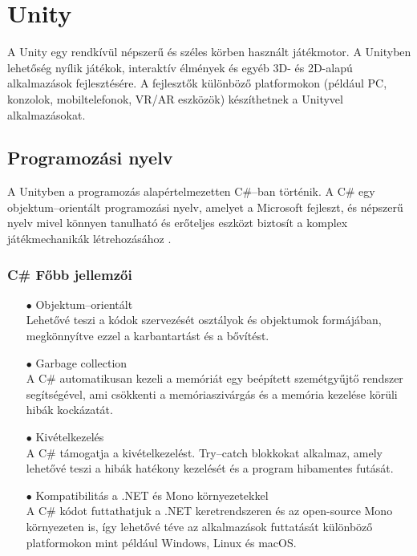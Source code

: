 \documentclass[
]{thesis-ekf}
\theoremstyle{definition}
\theoremstyle{remark}
\begin{document}
\section{Unity}
\label{sec:Unity}
A Unity egy rendkívül népszerű és széles körben használt játékmotor. A Unityben lehetőség nyílik játékok, interaktív élmények és egyéb 3D- és 2D-alapú alkalmazások fejlesztésére. A fejlesztők különböző platformokon (például PC, konzolok, mobiltelefonok, VR/AR eszközök) készíthetnek a Unityvel alkalmazásokat.
\subsection{Programozási nyelv}
A Unityben a programozás alapértelmezetten  C\#--ban történik. A C\# egy objektum--orientált programozási nyelv, amelyet a Microsoft fejleszt, és népszerű nyelv mivel könnyen tanulható és erőteljes eszközt biztosít a komplex játékmechanikák létrehozásához \cite{Csharp}.
\subsubsection{C\# Főbb jellemzői}
\begin{itemize}
	\item[$\bullet$]Objektum--orientált \\Lehetővé teszi a kódok szervezését osztályok és objektumok formájában, megkönnyítve ezzel a karbantartást és a bővítést.
	\item[$\bullet$]Garbage collection\\A C\# automatikusan kezeli a memóriát egy beépített szemétgyűjtő rendszer segítségével, ami csökkenti a memóriaszivárgás és a memória kezelése körüli hibák kockázatát.
	\item[$\bullet$]Kivételkezelés\\A C\# támogatja a kivételkezelést. Try--catch blokkokat alkalmaz, amely lehetővé teszi a hibák hatékony kezelését és a program hibamentes futását.
	\item[$\bullet$]Kompatibilitás a .NET és Mono környezetekkel\\A C\# kódot futtathatjuk a .NET keretrendszeren és az open-source Mono környezeten is, így lehetővé téve az alkalmazások futtatását különböző platformokon mint például Windows, Linux és macOS.
\end{itemize}
\end{document}
